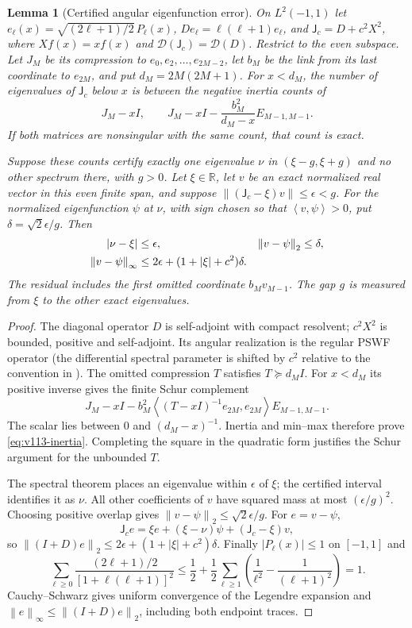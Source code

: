 \documentclass[11pt]{article}
\newtheorem{lemma}[theorem]{Lemma}
\theoremstyle{remark}
\newcommand{\norm}[1]{\left\lVert #1\right\rVert}
\newcommand{\ip}[2]{\left\langle #1,#2\right\rangle}
\begin{document}
\begin{lemma}[Certified angular eigenfunction error]
\label{lem:v113-angular}
On $L^2(-1,1)$ let
$e_\ell(x)=\sqrt{(2\ell+1)/2}\,P_\ell(x)$,
$De_\ell=\ell(\ell+1)e_\ell$, and
$\mathsf J_c=D+c^2X^2$, where $Xf(x)=xf(x)$ and
$\mathcal D(\mathsf J_c)=\mathcal D(D)$.
Restrict to the even subspace. Let $J_M$ be its compression to
$e_0,e_2,\ldots,e_{2M-2}$, let $b_M$ be the link from its last
coordinate to $e_{2M}$, and put $d_M=2M(2M+1)$.
For $x<d_M$, the number of eigenvalues of $\mathsf J_c$ below $x$
is between the negative inertia counts of
\begin{equation}\label{eq:v113-inertia}
 J_M-xI,\qquad
 J_M-xI-\frac{b_M^2}{d_M-x}E_{M-1,M-1}.
\end{equation}
If both matrices are nonsingular with the same count, that count is exact.

Suppose these counts certify exactly one eigenvalue $\nu$ in
$(\xi-g,\xi+g)$ and no other spectrum there, with $g>0$.
Let $\xi\in\mathbb R$, let $v$ be an exact normalized real vector in
this even finite span, and suppose
$\norm{(\mathsf J_c-\xi)v}\le\epsilon<g$.
For the normalized eigenfunction $\psi$ at $\nu$, with sign chosen
so that $\ip v\psi>0$, put $\delta=\sqrt2\epsilon/g$.
Then
\begin{align}
 |\nu-\xi|&\le\epsilon,& \norm{v-\psi}_2&\le\delta,\notag\\
 \norm{v-\psi}_\infty
 &\le 2\epsilon+(1+|\xi|+c^2)\delta.
 \label{eq:v113-pointwise}
\end{align}
The residual includes the first omitted coordinate $b_Mv_{M-1}$.
The gap $g$ is measured from $\xi$ to the other exact eigenvalues.
\end{lemma}
\begin{proof}
The diagonal operator $D$ is self-adjoint with compact resolvent;
$c^2X^2$ is bounded, positive and self-adjoint. Its angular realization
is the regular PSWF operator (the differential spectral parameter is
shifted by $c^2$ relative to the convention in \cite{DLMFPSWF}).
The omitted compression $T$ satisfies $T\succeq d_MI$. For $x<d_M$
its positive inverse gives the finite Schur complement
\[
 J_M-xI-b_M^2\ip{(T-xI)^{-1}e_{2M}}{e_{2M}}E_{M-1,M-1}.
\]
The scalar lies between $0$ and $(d_M-x)^{-1}$. Inertia and min--max
therefore prove \eqref{eq:v113-inertia}. Completing the square in the
quadratic form justifies the Schur argument for the unbounded $T$.

The spectral theorem places an eigenvalue within $\epsilon$ of $\xi$;
the certified interval identifies it as $\nu$. All other coefficients
of $v$ have squared mass at most $(\epsilon/g)^2$. Choosing positive
overlap gives $\norm{v-\psi}_2\le\sqrt2\epsilon/g$.
For $e=v-\psi$,
\[
 \mathsf J_ce=\xi e+(\xi-\nu)\psi+(\mathsf J_c-\xi)v,
\]
so $\norm{(I+D)e}_2\le2\epsilon+(1+|\xi|+c^2)\delta$.
Finally $|P_\ell(x)|\le1$ on $[-1,1]$ and
\[
 \sum_{\ell\ge0}\frac{(2\ell+1)/2}{[1+\ell(\ell+1)]^2}
 \le\frac12+\frac12\sum_{\ell\ge1}
             \left(\frac1{\ell^2}-\frac1{(\ell+1)^2}\right)=1.
\]
Cauchy--Schwarz gives uniform convergence of the Legendre expansion and
$\norm e_\infty\le\norm{(I+D)e}_2$, including both endpoint traces.
\end{proof}
\end{document}
